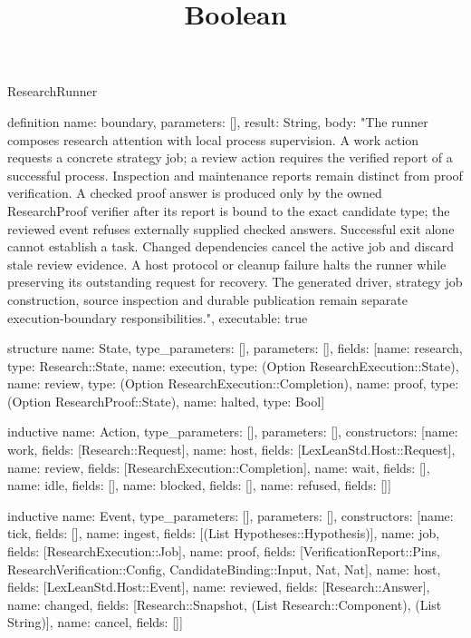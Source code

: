 \begin{lexlean}{ResearchRunner}
\title{Boolean}
\begin{semanticmodule}
definition{
  name: boundary,
  parameters: [],
  result: String,
  body: "The runner composes research attention with local process supervision. A work action requests a concrete strategy job; a review action requires the verified report of a successful process. Inspection and maintenance reports remain distinct from proof verification. A checked proof answer is produced only by the owned ResearchProof verifier after its report is bound to the exact candidate type; the reviewed event refuses externally supplied checked answers. Successful exit alone cannot establish a task. Changed dependencies cancel the active job and discard stale review evidence. A host protocol or cleanup failure halts the runner while preserving its outstanding request for recovery. The generated driver, strategy job construction, source inspection and durable publication remain separate execution-boundary responsibilities.",
  executable: true
}

structure{
  name: State,
  type_parameters: [],
  parameters: [],
  fields: [{name: research, type: Research::State}, {name: execution, type: (Option ResearchExecution::State)}, {name: review, type: (Option ResearchExecution::Completion)}, {name: proof, type: (Option ResearchProof::State)}, {name: halted, type: Bool}]
}

inductive{
  name: Action,
  type_parameters: [],
  parameters: [],
  constructors: [{name: work, fields: [Research::Request]}, {name: host, fields: [LexLeanStd.Host::Request]}, {name: review, fields: [ResearchExecution::Completion]}, {name: wait, fields: []}, {name: idle, fields: []}, {name: blocked, fields: []}, {name: refused, fields: []}]
}

inductive{
  name: Event,
  type_parameters: [],
  parameters: [],
  constructors: [{name: tick, fields: []}, {name: ingest, fields: [(List Hypotheses::Hypothesis)]}, {name: job, fields: [ResearchExecution::Job]}, {name: proof, fields: [VerificationReport::Pins, ResearchVerification::Config, CandidateBinding::Input, Nat, Nat]}, {name: host, fields: [LexLeanStd.Host::Event]}, {name: reviewed, fields: [Research::Answer]}, {name: changed, fields: [Research::Snapshot, (List Research::Component), (List String)]}, {name: cancel, fields: []}]
}


\end{semanticmodule}
\end{lexlean}
